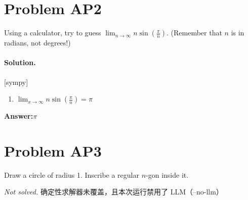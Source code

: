 \documentclass[11pt,a4paper]{article}
\newcommand{\solvertag}[1]{{\footnotesize\color{gray}\textsf{[#1]}}}
\begin{document}
\section*{Problem AP2}
Using a calculator, try to guess $\lim_{n \to \infty} n \sin(\frac{\pi}{n})$. (Remember that $n$ is in radians, not degrees!)

\paragraph{Solution.} \solvertag{sympy} 

\begin{enumerate}[leftmargin=*]
  \item $\lim_{x \to \infty} n \sin{\left(\frac{\pi}{n} \right)} = \pi$
\end{enumerate}

\noindent\textbf{Answer:}\quad $\pi$

\medskip

\section*{Problem AP3}
Draw a circle of radius 1. Inscribe a regular $n$-gon inside it.

{\color{red}\textit{Not solved.} 确定性求解器未覆盖，且本次运行禁用了 LLM（--no-llm）}

\medskip
\end{document}
